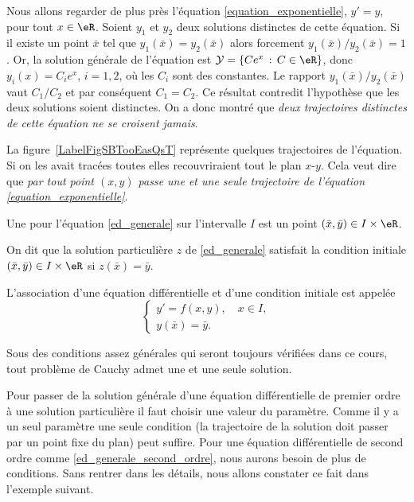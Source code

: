 \begin{example}
	Nous allons regarder de plus près l'équation \eqref{equation_exponentielle}, $y'=y$, pour tout $x\in\eR$. Soient $y_1$ et $y_2$ deux solutions distinctes de cette équation. Si il existe un point $\bar x$ tel que $y_1(\bar x) = y_2 (\bar x)$ alors forcement $y_1(\bar x)/y_2 (\bar x)=1$. Or, la solution générale de l'équation est \(\mathcal{Y} = \{Ce^x\, : \, C\in\eR\}\), donc $y_i(x) = C_ie^x$, $i= 1,2$, o\`u les $C_i$ sont des constantes. Le rapport $y_1(\bar x)/y_2 (\bar x)$ vaut $C_1/C_2$ et par conséquent $C_1 = C_2$. Ce résultat contredit l'hypothèse que les deux solutions soient distinctes. On a donc montré que \emph{deux trajectoires distinctes de cette équation ne se croisent jamais}.

	\newcommand{\CaptionFigSBTooEasQsT}{Quelques trajectoires de l'équation \( y'=y\).}
	

	La figure~\ref{LabelFigSBTooEasQsT} représente quelques trajectoires de l'équation. Si on les avait tracées toutes elles recouvriraient tout le plan $x$-$y$. Cela veut dire que \emph{par tout point $(x,y)$ passe une et une seule trajectoire de l'équation \eqref{equation_exponentielle}}.

\end{example}
\begin{definition}
	Une  pour l'équation \eqref{ed_generale} sur l'intervalle \(I\) est un point \((\bar x, \bar y)\in I\times\eR\).

	On dit que la solution particulière \(z\) de \eqref{ed_generale} satisfait la condition initiale \((\bar x, \bar y)\in I\times\eR\) si \(z(\bar x) =\bar y\).
\end{definition}
\begin{definition}
	L'association d'une équation différentielle et d'une condition initiale est appelée 
	\begin{equation}\label{plme_cauchy}
		\begin{cases}
			y'= f(x,y), \quad x\in I, \\
			y(\bar x) = \bar y.
		\end{cases}
	\end{equation}
\end{definition}
\begin{remark}
	Sous des conditions assez générales qui seront toujours vérifiées dans ce cours, tout problème de Cauchy admet une et une seule solution.
\end{remark}
Pour passer de la solution générale d'une équation différentielle de premier ordre \`a une solution particulière il faut choisir une valeur du paramètre. Comme il y a un seul paramètre une seule condition (la trajectoire de la solution doit passer par un point fixe du plan) peut suffire. Pour une équation différentielle de second ordre comme \eqref{ed_generale_second_ordre}, nous aurons besoin de plus de conditions. Sans rentrer dans les détails, nous allons constater ce fait dans l'exemple suivant.

